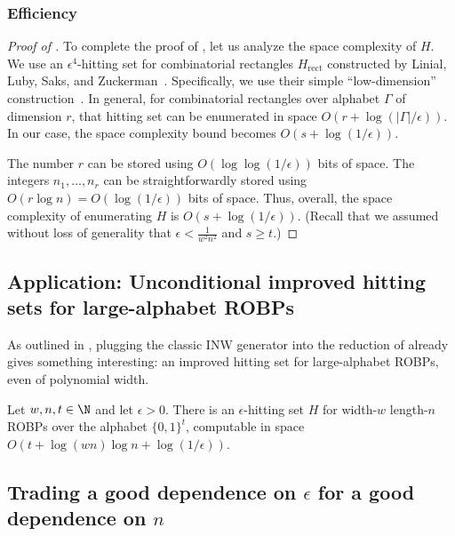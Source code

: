 \subsubsection{Efficiency}

\begin{proof}[Proof of ]
To complete the proof of , let us analyze the space complexity of $H$. We use an $\epsilon^4$-hitting set for combinatorial rectangles $H_{\text{rect}}$ constructed by Linial, Luby, Saks, and Zuckerman~\cite{LLSZ97}. Specifically, we use their simple ``low-dimension'' construction~\cite[Section 5]{LLSZ97}. In general, for combinatorial rectangles over alphabet $\Gamma$ of dimension $r$, that hitting set can be enumerated in space $O(r + \log(|\Gamma|/\epsilon))$. In our case, the space complexity bound becomes $O(s + \log(1/\epsilon))$.

The number $r$ can be stored using $O(\log \log(1/\epsilon))$ bits of space.
The integers $n_1, \dots, n_r$ can be straightforwardly stored using $O(r \log n) = O(\log(1/\epsilon))$ bits of space. Thus, overall, the space complexity of enumerating $H$ is $O(s + \log(1/\epsilon))$. (Recall that we assumed without loss of generality that $\epsilon < \frac{1}{w^2 n^2}$ and $s \geq t$.)
\end{proof}

\subsection{Application: Unconditional improved hitting sets for large-alphabet ROBPs}
As outlined in , plugging the classic INW generator \cite{INW94} into the reduction of  already gives something interesting: an improved hitting set for large-alphabet ROBPs, even of polynomial width.
\begin{corollary} \label{cor:large-alphabet-hz}
Let $w, n, t \in \N$ and let $\epsilon > 0$. There is an $\epsilon$-hitting set $H$ for width-$w$ length-$n$ ROBPs over the alphabet $\{0, 1\}^t$, computable in space $O(t + \log(wn) \log n + \log(1/\epsilon))$.
\end{corollary}

\subsection{Trading a good dependence on $\epsilon$ for a good dependence on $n$}

